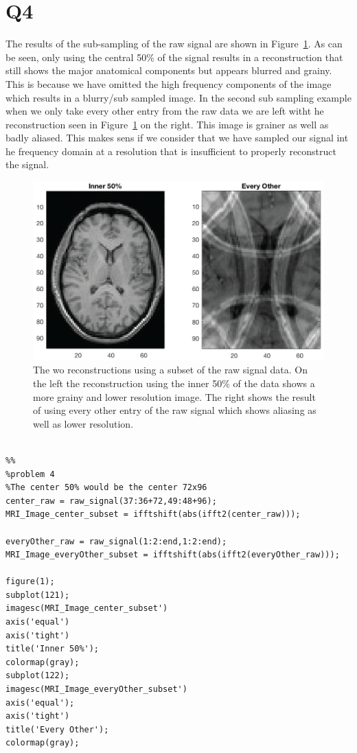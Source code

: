 \documentclass[12pt]{article}
\begin{document}
\section{Q4}
The results of the sub-sampling of the raw signal are shown in Figure~\ref{Fig:subset}. As can be seen, only using the central 50\% of the signal results in a reconstruction that still shows the major anatomical components but appears blurred and grainy. This is because we have omitted the high frequency components of the image which results in a blurry/sub sampled image. In the second sub sampling example when we only take every other entry from the raw data we are left witht he reconstruction seen in Figure~\ref{Fig:subset} on the right. This image is grainer as well as badly aliased. This makes sens if we consider that we have sampled our signal int he frequency domain at a resolution that is insufficient to properly reconstruct the signal. 

\begin{figure}[H]

	\centering
	
	\includegraphics[width=.8\textwidth]{Figures/subset.png}
		
	\caption{The wo reconstructions using a subset of the raw signal data. On the left the reconstruction using the inner 50\% of the data shows a more grainy and lower resolution image. The right shows the result of using every other entry of the raw signal which shows aliasing as well as lower resolution.}
	\label{Fig:subset}
\end{figure}
\begin{lstlisting}[style=Matlab-editor]

%%
%problem 4
%The center 50% would be the center 72x96
center_raw = raw_signal(37:36+72,49:48+96);
MRI_Image_center_subset = ifftshift(abs(ifft2(center_raw)));

everyOther_raw = raw_signal(1:2:end,1:2:end);
MRI_Image_everyOther_subset = ifftshift(abs(ifft2(everyOther_raw)));

figure(1);
subplot(121);
imagesc(MRI_Image_center_subset')
axis('equal')
axis('tight')
title('Inner 50%');
colormap(gray);
subplot(122);
imagesc(MRI_Image_everyOther_subset')
axis('equal');
axis('tight')
title('Every Other');
colormap(gray);

\end{lstlisting}
\end{document}
